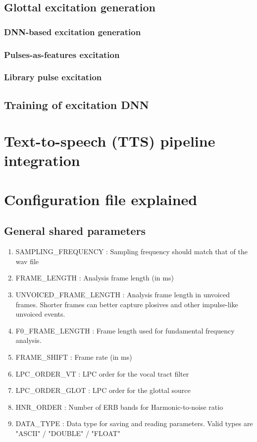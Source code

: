 \documentclass[a4paper, 11pt]{article}
\begin{document}
\subsection{Glottal excitation generation}

\subsubsection{DNN-based excitation generation}

\subsubsection{Pulses-as-features excitation}

\subsubsection{Library pulse excitation}

\subsection{Training of excitation DNN}

\section{Text-to-speech (TTS) pipeline integration}

\section{Configuration file explained}

\subsection{General shared parameters}

\begin{enumerate}
    \item[]  SAMPLING\_FREQUENCY : 
    Sampling frequency should match that of the wav file
    \item[]  FRAME\_LENGTH :
    Analysis frame length (in ms)
    \item[]   UNVOICED\_FRAME\_LENGTH :
    Analysis frame length in unvoiced frames. Shorter frames can better capture plosives and other impulse-like unvoiced events.
    \item[] F0\_FRAME\_LENGTH : Frame length used for fundamental frequency analysis. 
    \item[] FRAME\_SHIFT :
    Frame rate (in ms)
    \item[] LPC\_ORDER\_VT : 
    LPC order for the vocal tract filter
    \item[] LPC\_ORDER\_GLOT :
    LPC order for the glottal source
    \item[] HNR\_ORDER :
    Number of ERB bands for Harmonic-to-noise ratio
    \item[] DATA\_TYPE : Data type for saving and reading parameters. Valid types are "ASCII" / "DOUBLE" / "FLOAT"    
\end{enumerate}
\end{document}
